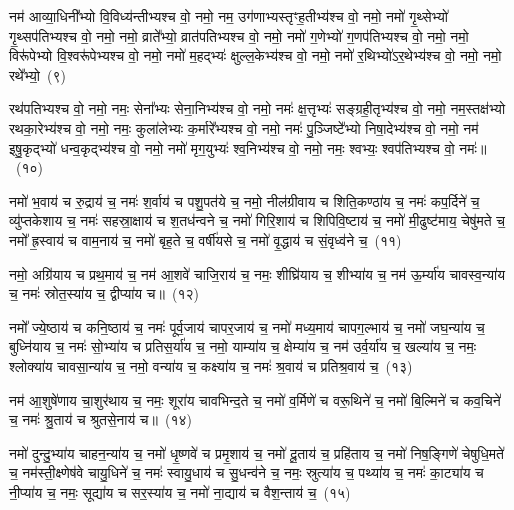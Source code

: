 {\anuvakamend[{कु॒लु॒ञ्चानां॒ पत॑ये॒ नमो॒ नमो\-ऽश्व॑पतिभ्य॒स्त्रीणि॑ च}]}

नम॑ आव्या॒धिनी᳚भ्यो वि॒विध्य॑न्तीभ्यश्च वो॒ नमो॒ नम॒ उग॑णाभ्यस्तृꣳह॒तीभ्य॑श्च वो॒ नमो॒ नमो॑ गृ॒थ्सेभ्यो॑ गृ॒थ्सप॑तिभ्यश्च वो॒ नमो॒ नमो॒ व्राते᳚भ्यो॒ व्रात॑पतिभ्यश्च वो॒ नमो॒ नमो॑ ग॒णेभ्यो॑ ग॒णप॑तिभ्यश्च वो॒ नमो॒ नमो॒ विरू॑पेभ्यो वि॒श्वरू॑पेभ्यश्च वो॒ नमो॒ नमो॑ म॒हद्भ्यः॑ क्षुल्ल॒केभ्य॑श्च वो॒ नमो॒ नमो॑ र॒थिभ्यो॑\-ऽर॒थेभ्य॑श्च वो॒ नमो॒ नमो॒ रथे᳚भ्यो॒~(९)\ip

रथ॑पतिभ्यश्च वो॒ नमो॒ नमः॒ सेना᳚भ्यः सेना॒निभ्य॑श्च वो॒ नमो॒ नमः॑ क्ष॒त्तृभ्यः॑ सङ्ग्रही॒तृभ्य॑श्च वो॒ नमो॒ नम॒स्तक्ष॑भ्यो रथका॒रेभ्य॑श्च वो॒ नमो॒ नमः॒ कुला॑लेभ्यः क॒र्मारे᳚भ्यश्च वो॒ नमो॒ नमः॑ पु॒ञ्जिष्टे᳚भ्यो निषा॒देभ्य॑श्च वो॒ नमो॒ नम॑ इषु॒कृद्भ्यो॑ धन्व॒कृद्भ्य॑श्च वो॒ नमो॒ नमो॑ मृग॒युभ्यः॑ श्व॒निभ्य॑श्च वो॒ नमो॒ नमः॒ श्वभ्यः॒ श्वप॑तिभ्यश्च वो॒ नमः॑॥~(१०)\ip

{\anuvakamend[{रथे᳚भ्यः॒ श्वप॑तिभ्यश्च॒ द्वे च॑}]}

नमो॑ भ॒वाय॑ च रु॒द्राय॑ च॒ नमः॑ श॒र्वाय॑ च पशु॒पत॑ये च॒ नमो॒ नील॑ग्रीवाय च शिति॒कण्ठा॑य च॒ नमः॑ कप॒र्दिने॑ च॒ व्यु॑प्तकेशाय च॒ नमः॑ सहस्रा॒क्षाय॑ च श॒तध॑न्वने च॒ नमो॑ गिरि॒शाय॑ च शिपिवि॒ष्टाय॑ च॒ नमो॑ मी॒ढुष्ट॑माय॒ चेषु॑मते च॒ नमो᳚ ह्र॒स्वाय॑ च वाम॒नाय॑ च॒ नमो॑ बृह॒ते च॒ वर्\mbox{}षी॑यसे च॒ नमो॑ वृ॒द्धाय॑ च सं॒वृध्व॑ने च॒~(११)\ip

नमो॒ अग्रि॑याय च प्रथ॒माय॑ च॒ नम॑ आ॒शवे॑ चाजि॒राय॑ च॒ नमः॒ शीघ्रि॑याय च॒ शीभ्या॑य च॒ नम॑ ऊ॒र्म्या॑य चावस्व॒न्या॑य च॒ नमः॑ स्रोत॒स्या॑य च॒ द्वीप्या॑य च॥~(१२)\ip

{\anuvakamend[{सं॒ वृध्व॑ने च॒ पञ्च॑विꣳशतिश्च}]}

नमो᳚ ज्ये॒ष्ठाय॑ च कनि॒ष्ठाय॑ च॒ नमः॑ पूर्व॒जाय॑ चापर॒जाय॑ च॒ नमो॑ मध्य॒माय॑ चापग॒ल्भाय॑ च॒ नमो॑ जघ॒न्या॑य च॒ बुध्नि॑याय च॒ नमः॑ सो॒भ्या॑य च प्रतिस॒र्या॑य च॒ नमो॒ याम्या॑य च॒ क्षेम्या॑य च॒ नम॑ उर्व॒र्या॑य च॒ खल्या॑य च॒ नमः॒ श्लोक्या॑य चावसा॒न्या॑य च॒ नमो॒ वन्या॑य च॒ कक्ष्या॑य च॒ नमः॑ श्र॒वाय॑ च प्रतिश्र॒वाय॑ च॒~(१३)\ip

नम॑ आ॒शुषे॑णाय चा॒शुर॑थाय च॒ नमः॒ शूरा॑य चावभिन्द॒ते च॒ नमो॑ व॒र्मिणे॑ च वरू॒थिने॑ च॒ नमो॑ बि॒ल्मिने॑ च कव॒चिने॑ च॒ नमः॑ श्रु॒ताय॑ च श्रुतसे॒नाय॑ च॥~(१४)\ip

{\anuvakamend[{प्र॒ति॒श्र॒वाय॑ च॒ पञ्च॑विꣳशतिश्च}]}

नमो॑ दुन्दु॒भ्या॑य चाहन॒न्या॑य च॒ नमो॑ धृ॒ष्णवे॑ च प्रमृ॒शाय॑ च॒ नमो॑ दू॒ताय॑ च॒ प्रहि॑ताय च॒ नमो॑ निष॒ङ्गिणे॑ चेषुधि॒मते॑ च॒ नम॑स्ती॒क्ष्णेष॑वे चायु॒धिने॑ च॒ नमः॑ स्वायु॒धाय॑ च सु॒धन्व॑ने च॒ नमः॒ स्रुत्या॑य च॒ पथ्या॑य च॒ नमः॑ का॒ट्या॑य च नी॒प्या॑य च॒ नमः॒ सूद्या॑य च सर॒स्या॑य च॒ नमो॑ ना॒द्याय॑ च वैश॒न्ताय॑ च॒~(१५)\ip

